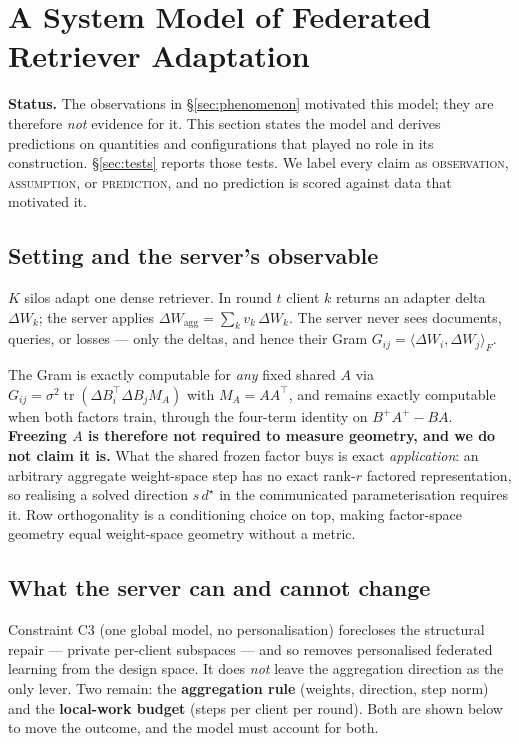 \section{A System Model of Federated Retriever Adaptation}\label{sec:model}

\noindent\textbf{Status.} The observations in \S\ref{sec:phenomenon} motivated this
model; they are therefore \emph{not} evidence for it. This section states the
model and derives predictions on quantities and configurations that played no
role in its construction. \S\ref{sec:tests} reports those tests. We label every
claim as \textsc{observation}, \textsc{assumption}, or \textsc{prediction}, and
no prediction is scored against data that motivated it.

\subsection{Setting and the server's observable}

$K$ silos adapt one dense retriever. In round $t$ client $k$ returns an adapter
delta $\Delta W_k$; the server applies $\Delta W_{\mathrm{agg}}=\sum_k
v_k\,\Delta W_k$. The server never sees documents, queries, or losses --- only
the deltas, and hence their Gram
$G_{ij}=\langle\Delta W_i,\Delta W_j\rangle_F$.

The Gram is exactly computable for \emph{any} fixed shared $A$ via
$G_{ij}=\sigma^2\operatorname{tr}(\Delta B_i^\top \Delta B_j M_A)$ with
$M_A=AA^\top$, and remains exactly computable when both factors train, through
the four-term identity on $B^+A^+-BA$. \textbf{Freezing $A$ is therefore not
required to measure geometry, and we do not claim it is.} What the shared frozen
factor buys is exact \emph{application}: an arbitrary aggregate weight-space
step has no exact rank-$r$ factored representation, so realising a solved
direction $s\,d^\star$ in the communicated parameterisation requires it. Row
orthogonality is a conditioning choice on top, making factor-space geometry
equal weight-space geometry without a metric.

\subsection{What the server can and cannot change}

Constraint C3 (one global model, no personalisation) forecloses the structural
repair --- private per-client subspaces --- and so removes personalised
federated learning from the design space. It does \emph{not} leave the
aggregation direction as the only lever. Two remain: the \textbf{aggregation
rule} (weights, direction, step norm) and the \textbf{local-work budget} (steps
per client per round). Both are shown below to move the outcome, and the model
must account for both.

